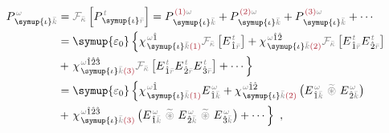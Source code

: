 \begin{subequations}
\begin{align}
	P^{\;\!\mathcolor{gray}{\omega}}_{\;\! \symup{\iota}\mathcolor{gray}{\bar{k}}} &= \mathcolor{gray}{\mathcal F_{\bar{\kappa}}} \left[ P^{\;\! \mathcolor{gray}{t}}_{\;\! \symup{\iota}\mathcolor{gray}{\bar{r}}} \right] = P^{\;\! \textcolor{Maroon}{(1)} \mathcolor{gray}{\omega}}_{\;\! \symup{\iota}\mathcolor{gray}{\bar{k}}} + P^{\;\! \textcolor{Maroon}{(2)} \mathcolor{gray}{\omega}}_{\;\! \symup{\iota}\mathcolor{gray}{\bar{k}}} + P^{\;\! \textcolor{Maroon}{(3)} \mathcolor{gray}{\omega}}_{\;\! \symup{\iota}\mathcolor{gray}{\bar{k}}} + \cdots \\ &= {\symup{\varepsilon_0}} \left\{ \chi^{\;\! \mathcolor{gray}{\omega} \hat{1}}_{\;\! \symup{\iota} \mathcolor{gray}{\bar{k}} \textcolor{Maroon}{(1)}} \mathcolor{gray}{\mathcal F_{\bar{\kappa}}} \left[ E^{\;\!\mathcolor{gray}{t}}_{\;\! \hat{1} \mathcolor{gray}{\bar{r}}} \right] + \chi^{\;\! \mathcolor{gray}{\omega} \hat{1} \hat{2}}_{\;\! \symup{\iota} \mathcolor{gray}{\bar{k}} \textcolor{Maroon}{(2)}} \mathcolor{gray}{\mathcal F_{\bar{\kappa}}} \left[ E^{\;\!\mathcolor{gray}{t}}_{\;\! \hat{1} \mathcolor{gray}{\bar{r}}} E^{\;\!\mathcolor{gray}{t}}_{\;\! \hat{2} \mathcolor{gray}{\bar{r}}} \right] \right. \label{P_wk} \\ &+ \left. \chi^{\;\! \mathcolor{gray}{\omega} \hat{1} \hat{2} \hat{3}}_{\;\! \symup{\iota} \mathcolor{gray}{\bar{k}} \textcolor{Maroon}{(3)}} \mathcolor{gray}{\mathcal F_{\bar{\kappa}}} \left[ E^{\;\!\mathcolor{gray}{t}}_{\;\! \hat{1} \mathcolor{gray}{\bar{r}}} E^{\;\!\mathcolor{gray}{t}}_{\;\! \hat{2} \mathcolor{gray}{\bar{r}}} E^{\;\!\mathcolor{gray}{t}}_{\;\! \hat{3} \mathcolor{gray}{\bar{r}}} \right] + \cdots \right\}
	\\ &= {\symup{\varepsilon_0}} \left\{ \chi^{\;\! \mathcolor{gray}{\omega} \hat{1}}_{\;\! \symup{\iota} \mathcolor{gray}{\bar{k}} \textcolor{Maroon}{(1)}} E^{\;\!\mathcolor{gray}{\omega}}_{\;\! \hat{1} \mathcolor{gray}{\bar{k}}} + \chi^{\;\! \mathcolor{gray}{\omega} \hat{1} \hat{2}}_{\;\! \symup{\iota} \mathcolor{gray}{\bar{k}} \textcolor{Maroon}{(2)}} \left( E^{\;\!\mathcolor{gray}{\omega}}_{\;\! \hat{1} \mathcolor{gray}{\bar{k}}} ~\mathcolor{gray}{\widetilde \circledast}~ E^{\;\!\mathcolor{gray}{\omega}}_{\;\! \hat{2} \mathcolor{gray}{\bar{k}}} \right) \right. \\ &+ \left. \chi^{\;\! \mathcolor{gray}{\omega} \hat{1} \hat{2} \hat{3}}_{\;\! \symup{\iota} \mathcolor{gray}{\bar{k}} \textcolor{Maroon}{(3)}} \left( E^{\;\!\mathcolor{gray}{\omega}}_{\;\! \hat{1} \mathcolor{gray}{\bar{k}}} ~\mathcolor{gray}{\widetilde \circledast}~ E^{\;\!\mathcolor{gray}{\omega}}_{\;\! \hat{2} \mathcolor{gray}{\bar{k}}} ~\mathcolor{gray}{\widetilde \circledast}~ E^{\;\!\mathcolor{gray}{\omega}}_{\;\! \hat{3} \mathcolor{gray}{\bar{k}}} \right) + \cdots \right\}~,
\end{align}
\end{subequations}
